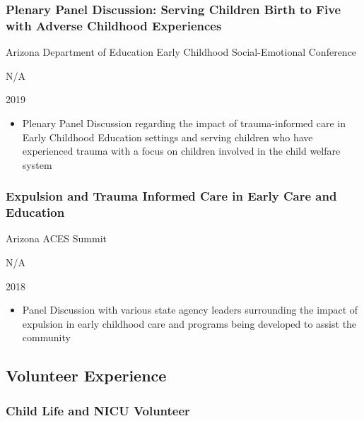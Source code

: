 \documentclass[
]{article}
\providecommand{\tightlist}{%
  \setlength{\itemsep}{0pt}\setlength{\parskip}{0pt}}
\begin{document}
\hypertarget{plenary-panel-discussion-serving-children-birth-to-five-with-adverse-childhood-experiences}{%
\subsubsection{Plenary Panel Discussion: Serving Children Birth to Five
with Adverse Childhood
Experiences}\label{plenary-panel-discussion-serving-children-birth-to-five-with-adverse-childhood-experiences}}

Arizona Department of Education Early Childhood Social-Emotional
Conference

N/A

2019

\begin{itemize}
\tightlist
\item
  Plenary Panel Discussion regarding the impact of trauma-informed care
  in Early Childhood Education settings and serving children who have
  experienced trauma with a focus on children involved in the child
  welfare system
\end{itemize}

\hypertarget{expulsion-and-trauma-informed-care-in-early-care-and-education}{%
\subsubsection{Expulsion and Trauma Informed Care in Early Care and
Education}\label{expulsion-and-trauma-informed-care-in-early-care-and-education}}

Arizona ACES Summit

N/A

2018

\begin{itemize}
\tightlist
\item
  Panel Discussion with various state agency leaders surrounding the
  impact of expulsion in early childhood care and programs being
  developed to assist the community
\end{itemize}

\hypertarget{volunteer-experience}{%
\subsection{Volunteer Experience}\label{volunteer-experience}}

\hypertarget{child-life-and-nicu-volunteer}{%
\subsubsection{Child Life and NICU
Volunteer}\label{child-life-and-nicu-volunteer}}
\end{document}
